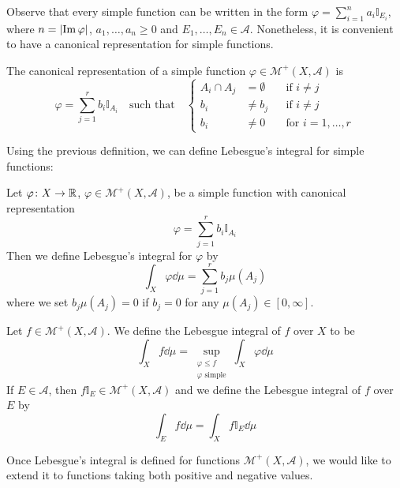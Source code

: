 Observe that every simple function can be written in the form $\varphi =
\sum_{i=1}^n a_i \mathbb{I}_{E_i}$, where $n = \abs{\operatorname{Im}{\varphi}}$, $a_1, \ldots, a_n \geq 0$ and $E_1,
\ldots, E_n \in \mathcal{A}$. Nonetheless, it is convenient to have a canonical representation for simple functions.

\begin{definition*}
	The canonical representation of a simple function $\varphi \in \mathcal{M}^+(X, \mathcal{A})$ is
	\[
		\varphi = \sum_{j=1}^r b_i\mathbb{I}_{A_i} \quad \text{such that} \quad
		\left\{
			\begin{aligned}
				A_i \cap A_j &= \emptyset 	& &\text{if } i \neq j \\
				b_i &\neq b_j				& &\text{if } i \neq j \\
				b_i &\neq 0					& &\text{for } i = 1, \ldots, r
			\end{aligned}
		\right.
	\]
\end{definition*}

Using the previous definition, we can define Lebesgue's integral for simple functions:

\begin{definition*}
	Let $\varphi \colon X \rightarrow \mathbb{R}$, $\varphi \in \mathcal{M}^+(X,
	\mathcal{A})$, be a simple function with canonical representation
	\[
		\varphi = \sum_{j=1}^r b_i\mathbb{I}_{A_i}
	\]
	Then we define Lebesgue's integral for $\varphi$ by
	\[
		\int_X \varphi \dd{\mu} = \sum_{j=1}^r b_j \mu(A_j)	
	\]
	where we set $b_j \mu(A_j) = 0$ if $b_j = 0$ for any $\mu(A_j) \in [0, \infty]$.
\end{definition*}

\begin{definition*}
	Let $f \in \mathcal{M}^+(X, \mathcal{A})$. We define the Lebesgue integral
	of $f$ over $X$ to be
	\[
		\int_X f \dd{\mu} = 
		\sup_{\substack{\varphi \leq f \\ \varphi \text{ simple}}} \int_X \varphi \dd{\mu}	
	\]
	If $E \in \mathcal{A}$, then $f \mathbb{I}_E \in \mathcal{M}^+(X,
	\mathcal{A})$ and we define the Lebesgue integral of $f$ over $E$ by
	\[
		\int_E f \dd{\mu} = \int_X f \mathbb{I}_E \dd{\mu}
	\] 
\end{definition*}

Once Lebesgue's integral is defined for functions $\mathcal{M}^+(X,
\mathcal{A})$, we would like to extend it to functions taking both positive and
negative values.

